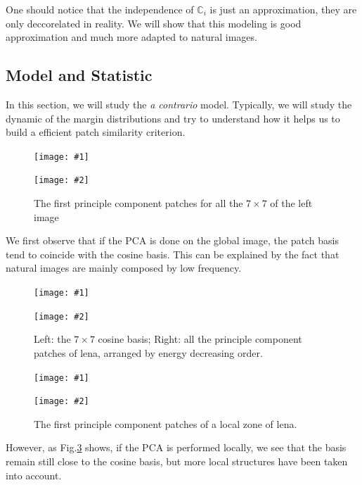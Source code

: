 \documentclass[runningheads]{llncs}
\newcommand{\rand}[1]{\ensuremath{\mathbb{#1}}}
\newcommand{\insertTwoF}[5]{
  \begin{figure}[h!]
    \centering
    \begin{minipage}{#4\linewidth}
    \texttt{[image: \#1]}
    \end{minipage}
    \begin{minipage}{#4\linewidth}
    \texttt{[image: \#2]}
    \end{minipage}
      \caption{#3}
      \label{#5}
  \end{figure}  
}
\begin{document}
One should notice that the independence of $\rand{C}_i$ is just an approximation, they are only deccorelated in reality. We will show that this modeling is good approximation and much more adapted to natural images.

\subsection{Model and Statistic}

In this section, we will study the \textit{a contrario} model. Typically, we will study the dynamic of the margin distributions and try to understand how it helps us to build a efficient patch similarity criterion.
\insertTwoF{lena}{patches}{The first principle component patches for all the $7\times 7$ of the left image}{0.45}{lena_patches}

We first observe that if the PCA is done on the global image, the patch basis tend to coincide with the cosine basis. This can be explained by the fact that natural images are mainly composed by low frequency.
\insertTwoF{cosine_basis}{princomp_lena}{Left: the $7\times 7$ cosine basis; Right: all the principle component patches of lena, arranged by energy decreasing order.}{0.45}{cosb}
\insertTwoF{lena_local}{patches_local}{The first principle component patches of a local zone of lena. }{0.45}{local}

However, as Fig.\ref{local} shows, if the PCA is performed locally, we see that the basis remain still close to the cosine basis, but more local structures have been taken into account.
\end{document}

